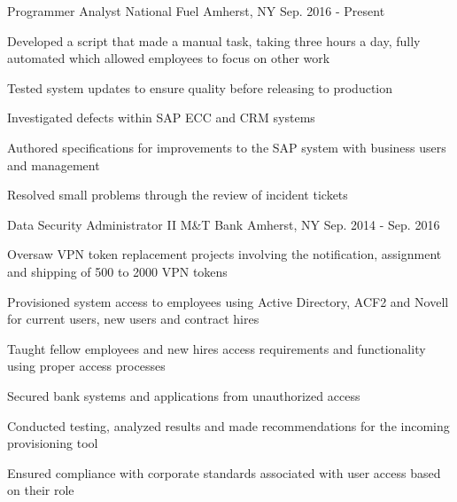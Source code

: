 

\begin{cventries}

  \cventry
    {Programmer Analyst} %
    {National Fuel} %
    {Amherst, NY} %
    {Sep. 2016 - Present} %
    {
      \begin{cvitems} %
        \item {Developed a script that made a manual task, taking three hours a day, fully automated which allowed employees to focus on other work}
        \item {Tested system updates to ensure quality before releasing to production}
        \item {Investigated defects within SAP ECC and CRM systems}
        \item {Authored specifications for improvements to the SAP system with business users and management}
        \item {Resolved small problems through the review of incident tickets}
      \end{cvitems}
    }

  \cventry
    {Data Security Administrator II} %
    {M\&T Bank} %
    {Amherst, NY} %
    {Sep. 2014 - Sep. 2016} %
    {
      \begin{cvitems} %
        \item {Oversaw VPN token replacement projects involving the notification, assignment and shipping of 500 to 2000 VPN tokens}
        \item {Provisioned system access to employees using Active Directory, ACF2 and Novell for current users, new users and contract hires}
        \item {Taught fellow employees and new hires access requirements and functionality using proper access processes}
        \item {Secured bank systems and applications from unauthorized access}
        \item {Conducted testing, analyzed results and made recommendations for the incoming provisioning tool}
        \item {Ensured compliance with corporate standards associated with user access based on their role}
      \end{cvitems}
    }


\end{cventries}
